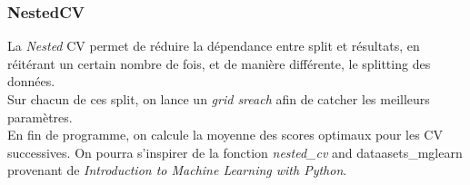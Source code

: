 \documentclass[a4paper,12pt]{report}
\newcommand{\rbk}[1]{\color{red}\textit{#1} \color{black}  
}
\numberwithin{equation}{section} %
\begin{document}
\subsubsection{NestedCV}
La \rbk {Nested} CV permet de réduire la dépendance entre split et résultats, en réitérant un certain nombre de fois, et de manière différente, le splitting des données.\\
Sur chacun de ces split, on lance un \rbk{grid sreach} afin de catcher les meilleurs paramètres.\\
En fin de programme, on calcule la moyenne des scores optimaux pour les CV successives.
On pourra s'inspirer de la fonction \rbk{nested\_cv} and dataasets\_mglearn provenant de \textit{Introduction to Machine Learning with Python}.

\pagebreak 
\end{document}
